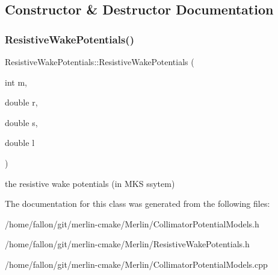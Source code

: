 \subsection{Constructor \& Destructor Documentation}
\mbox{\label{classResistiveWakePotentials_a6f109fb21a76cd90350f4046767ec699}} 
\subsubsection{\texorpdfstring{Resistive\+Wake\+Potentials()}{ResistiveWakePotentials()}}
{\footnotesize\ttfamily Resistive\+Wake\+Potentials\+::\+Resistive\+Wake\+Potentials (\begin{DoxyParamCaption}\item[{int}]{m,  }\item[{double}]{r,  }\item[{double}]{s,  }\item[{double}]{l }\end{DoxyParamCaption})}

the resistive wake potentials (in M\+KS ssytem) 

The documentation for this class was generated from the following files\+:\begin{DoxyCompactItemize}
\item 
/home/fallon/git/merlin-\/cmake/\+Merlin/Collimator\+Potential\+Models.\+h\item 
/home/fallon/git/merlin-\/cmake/\+Merlin/Resistive\+Wake\+Potentials.\+h\item 
/home/fallon/git/merlin-\/cmake/\+Merlin/Collimator\+Potential\+Models.\+cpp\end{DoxyCompactItemize}
